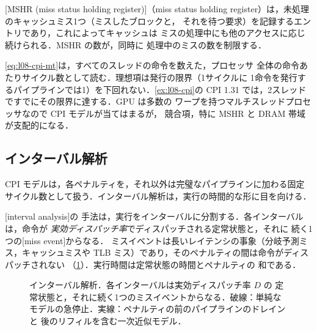 \documentclass[../main.tex]{subfiles}
\begin{document}
\begin{definition}[MSHR]
  \label{def:l08-mshr}
  [MSHR (miss status holding register)]（miss status
  holding register）は，未処理のキャッシュミス1つ（ミスしたブロックと，
  それを待つ要求）を記録するエントリであり，これによってキャッシュは
  ミスの処理中にも他のアクセスに応じ続けられる．MSHR の数が，同時に
  処理中のミスの数を制限する．
\end{definition}

\begin{note}
  \label{note:l08-cpi-mt}
  \eqref{eq:l08-cpi-mt}は，すべてのスレッドの命令を数えた，プロセッサ
  全体の命令あたりサイクル数として読む．理想項は発行の限界（1サイクルに
  1命令を発行するパイプラインでは1）を下回れない．\cref{ex:l08-cpi}の
  CPI 1.31 では，2スレッドですでにその限界に達する．GPU は多数の
  ワープを持つマルチスレッドプロセッサなので CPI モデルが当てはまるが，
  競合項，特に MSHR と DRAM 帯域が支配的になる．
\end{note}

\subsection{インターバル解析}

CPI モデルは，各ペナルティを，それ以外は完璧なパイプラインに加わる固定
サイクル数として扱う．インターバル解析は，実行の時間的な形に目を向ける．

\begin{definition}[インターバル解析]
  \label{def:l08-interval}
  [interval analysis]の
  手法は，実行をインターバルに分割する．各インターバルは，命令が
  \emph{実効ディスパッチ率}でディスパッチされる定常状態と，それに
  続く1つの[miss event]からなる．
  ミスイベントは長いレイテンシの事象（分岐予測ミス，キャッシュミスや
  TLB ミス）であり，そのペナルティの間は命令がディスパッチされない
  （\cref{fig:l08-interval}）．実行時間は定常状態の時間とペナルティの
  和である．
\end{definition}

\begin{figure}[tb]
  \centering
  
  \caption{インターバル解析．各インターバルは実効ディスパッチ率 $D$ の
    定常状態と，それに続く1つのミスイベントからなる．破線：単純な
    モデルの急停止．実線：ペナルティの前のパイプラインのドレインと
    後のリフィルを含む一次近似モデル．}
  \label{fig:l08-interval}
\end{figure}
\end{document}
